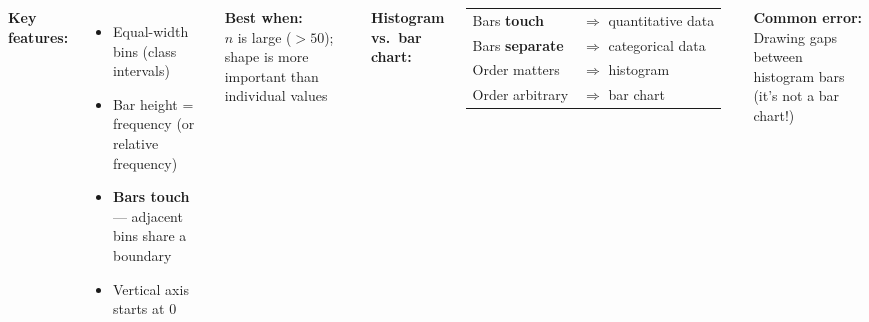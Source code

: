 \documentclass[aspectratio=169, 11pt]{beamer}
\begin{document}
{
\begin{frame}[t, plain]
  \hspace{0.55cm}%
  \begin{minipage}{0.9\textwidth}
    \vspace{0.2em}
    \begin{columns}[t]
        \small
        \textbf{\color{navy}Key features:}
        \begin{itemize}\setlength{\itemsep}{0.35em}
          \item Equal-width bins (class intervals)
          \item Bar height = frequency (or relative frequency)
          \item \textbf{Bars touch} --- adjacent bins share a boundary
          \item Vertical axis starts at 0
        \end{itemize}

        \vspace{0.3cm}
        \textbf{\color{navy}Best when:}\\
        $n$ is large ($> 50$); shape is more important than individual values

        \small
        \textbf{\color{navy}Histogram vs.\ bar chart:}

        \vspace{0.2cm}
        \begin{tabular}{ll}
        Bars \textbf{touch} & $\Rightarrow$ quantitative data \\
        Bars \textbf{separate} & $\Rightarrow$ categorical data \\
        Order matters & $\Rightarrow$ histogram \\
        Order arbitrary & $\Rightarrow$ bar chart \\
        \end{tabular}

        \vspace{0.3cm}
        \textbf{\color{redacc}Common error:}\\
        Drawing gaps between histogram bars (it's not a bar chart!)
    \end{columns}
  \end{minipage}
\end{frame}
}
\end{document}
